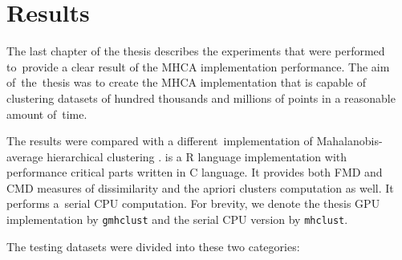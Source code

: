 \chapter{Results}

The last chapter of the thesis describes the experiments that were performed to~provide a clear result of the MHCA implementation performance. The aim of~the~thesis was to create the MHCA implementation that is capable of clustering datasets of hundred thousands and millions of points in a reasonable amount of~time.

The results were compared with a different\ implementation of Mahalanobis-average hierarchical clustering \cite{fivser2012detection}.  is a R language implementation with performance critical parts written in C language. It provides both FMD and CMD measures of dissimilarity and the apriori clusters computation as well. It performs a~serial CPU computation. For brevity, we denote the thesis GPU implementation by \texttt{gmhclust} and the serial CPU version by \texttt{mhclust}.

The testing datasets were divided into these two categories:

